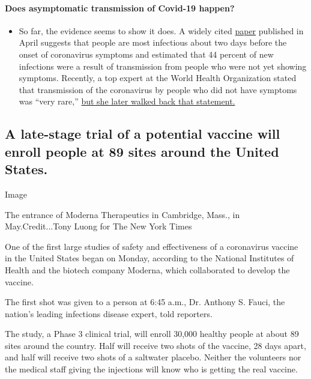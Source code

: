 \begin{itemize}
{  \paragraph{Does asymptomatic transmission of Covid-19
  happen?}\label{does-asymptomatic-transmission-of-covid-19-happen}}

  \begin{itemize}
  \tightlist
  \item
    So far, the evidence seems to show it does. A widely cited
    \href{https://www.nature.com/articles/s41591-020-0869-5}{paper}
    published in April suggests that people are most infectious about
    two days before the onset of coronavirus symptoms and estimated that
    44 percent of new infections were a result of transmission from
    people who were not yet showing symptoms. Recently, a top expert at
    the World Health Organization stated that transmission of the
    coronavirus by people who did not have symptoms was ``very rare,''
    \href{https://www.nytimes.com/2020/06/09/world/coronavirus-updates.html?action=click\&pgtype=Article\&state=default\&region=MAIN_CONTENT_3\&context=storylines_faq\#link-1f302e21}{but
    she later walked back that statement.}
  \end{itemize}
\end{itemize}

\hypertarget{a-late-stage-trial-of-a-potential-vaccine-will-enroll-people-at-89-sites-around-the-united-states}{%
\subsection{A late-stage trial of a potential vaccine will enroll people
at 89 sites around the United
States.}\label{a-late-stage-trial-of-a-potential-vaccine-will-enroll-people-at-89-sites-around-the-united-states}}

Image

The entrance of Moderna Therapeutics in Cambridge, Mass., in
May.Credit...Tony Luong for The New York Times

One of the first large studies of safety and effectiveness of a
coronavirus vaccine in the United States began on Monday, according to
the National Institutes of Health and the biotech company Moderna, which
collaborated to develop the vaccine.

The first shot was given to a person at 6:45 a.m., Dr. Anthony S. Fauci,
the nation's leading infections disease expert, told reporters.

The study, a Phase 3 clinical trial, will enroll 30,000 healthy people
at about 89 sites around the country. Half will receive two shots of the
vaccine, 28 days apart, and half will receive two shots of a saltwater
placebo. Neither the volunteers nor the medical staff giving the
injections will know who is getting the real vaccine.

